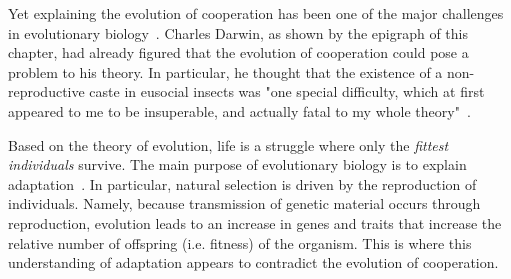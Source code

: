     Yet explaining the evolution of cooperation has been one of the major challenges in evolutionary biology~\parencite{Hamilton1964, Dugatkin2002, West2011a}. Charles Darwin, as shown by the epigraph of this chapter, had already figured that the evolution of cooperation could pose a problem to his theory. In particular, he thought that the existence of a non-reproductive caste in eusocial insects was "one special difficulty, which at first appeared to me to be insuperable, and actually fatal to my whole theory"~\parencite{Darwin1859}. 

    Based on the theory of evolution, life is a struggle where only the \emph{fittest individuals} survive. The main purpose of evolutionary biology is to explain adaptation~\parencite{West2011a}. In particular, natural selection is driven by the reproduction of individuals. Namely, because transmission of genetic material occurs through reproduction, evolution leads to an increase in genes and traits that increase the relative number of offspring (i.e. fitness) of the organism. This is where this understanding of adaptation appears to contradict the evolution of cooperation.




